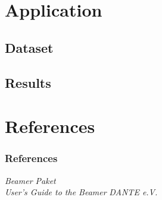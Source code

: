 \documentclass{beamer}
\begin{document}
\section{Application}

\subsection{Dataset}
\subsection{Results}


\section{References}
\begin{frame}

\frametitle{References}

\begin{thebibliography}{9}
 \emph{Beamer Paket} \\ 
 \emph{User's Guide to the Beamer} 
 \emph{DANTE e.V.}    
\end{thebibliography}


\end{frame}
\end{document}
